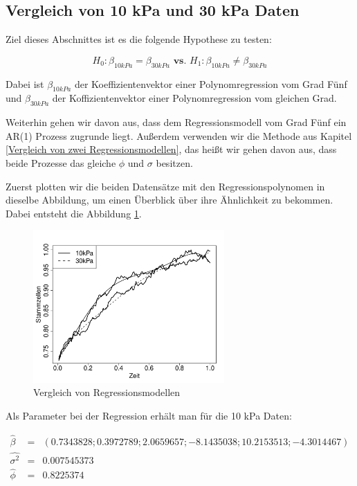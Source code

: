 \documentclass[12pt,a4paper]{article}
\theoremstyle{definition}
\theoremstyle{definition}
\theoremstyle{definition}
\theoremstyle{definition}
\begin{document}


\subsection{Vergleich von 10 kPa und 30 kPa Daten}
Ziel dieses Abschnittes ist es die folgende Hypothese zu testen:

\begin{equation*}
H_0 : \beta_{10 kPa} = \beta_{30 kPa} \textbf{ vs. } H_1 : \beta_{10 kPa} \neq \beta_{30 kPa}
\end{equation*}

Dabei ist $\beta_{10 kPa}$ der Koeffizientenvektor einer Polynomregression vom Grad Fünf und $\beta_{30 kPa}$ der Koffizientenvektor einer Polynomregression vom gleichen Grad. 

Weiterhin gehen wir davon aus, dass dem Regressionsmodell vom Grad Fünf ein AR(1) Prozess zugrunde liegt. Außerdem verwenden wir die Methode aus Kapitel \ref{Vergleich von zwei Regressionsmodellen}, das heißt wir gehen davon aus, dass beide Prozesse das gleiche $\phi$ und $\sigma$ besitzen.

Zuerst plotten wir die beiden Datensätze mit den Regressionspolynomen in dieselbe Abbildung, um einen Überblick über ihre Ähnlichkeit zu bekommen. Dabei entsteht die Abbildung \ref{Vergleich-10-30}.


\begin{figure}[H] 
  \centering
     \includegraphics[width=0.65\textwidth]{Vergleich-10vs30-poly5}
  \caption{Vergleich von Regressionsmodellen}
  \label{Vergleich-10-30}
\end{figure}

Als Parameter bei der Regression erhält man für die 10 kPa Daten:

\begin{eqnarray*}
\hat{\beta} &=& (0.7343828 ;  0.3972789 ; 2.0659657 ; -8.1435038 ; 10.2153513 ; -4.3014467)  \\
\widehat{\sigma^2} &=& 0.007545373 \\
\hat{\phi} &=& 0.8225374
\end{eqnarray*}
\end{document}
